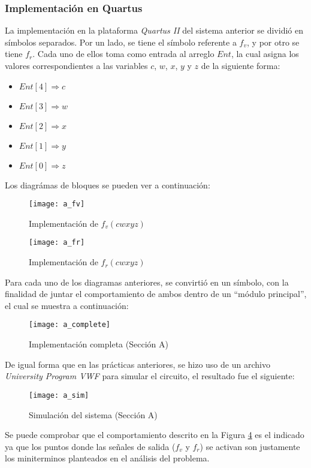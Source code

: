 \documentclass[../procedimientos.tex]{subfiles}
\begin{document}
\subsubsection{Implementación en Quartus}\label{subs:a_imp}
La implementación en la plataforma \textit{Quartus II} del sistema anterior se 
dividió en símbolos separados. Por un lado, se tiene el símbolo referente a 
$f_v$, y por otro se tiene $f_r$. Cada uno de ellos toma como entrada al 
arreglo $Ent$, la cual asigna los valores correspondientes a las variables 
$c$, $w$, $x$, $y$ y $z$ de la siguiente forma:
\begin{itemize}
  \item $Ent[4] \Rightarrow c$
  \item $Ent[3] \Rightarrow w$
  \item $Ent[2] \Rightarrow x$
  \item $Ent[1] \Rightarrow y$
  \item $Ent[0] \Rightarrow z$
\end{itemize}

Los diagrámas de bloques se pueden ver a continuación:
\begin{figure}[H]
  \centering
  \texttt{[image: a\_fv]}
  \caption{Implementación de $f_v(cwxyz)$}
  \label{fig:a_fv}
\end{figure}
\begin{figure}[H]
  \centering
  \texttt{[image: a\_fr]}
  \caption{Implementación de $f_r(cwxyz)$}
  \label{fig:a_fr}
\end{figure}

Para cada uno de los diagramas anteriores, se convirtió en un símbolo, con la 
finalidad de juntar el comportamiento de ambos dentro de un ``módulo 
principal'', el cual se muestra a continuación:
\begin{figure}[H]
  \centering
  \texttt{[image: a\_complete]}
  \caption{Implementación completa (Sección A)}
  \label{fig:a_complete}
\end{figure}

De igual forma que en las prácticas anteriores, se hizo uso de un archivo 
\textit{University Program VWF} para simular el circuito, el resultado fue el 
siguiente:
\begin{figure}[H]
  \centering
  \texttt{[image: a\_sim]}
  \caption{Simulación del sistema (Sección A)}
  \label{fig:a_sim}
\end{figure}

Se puede comprobar que el comportamiento descrito en la Figura \ref{fig:a_sim} 
es el indicado ya que los puntos donde las señales de salida ($f_v$ y $f_r$) 
se activan son justamente los miniterminos planteados en el análisis del 
problema.
\end{document}
